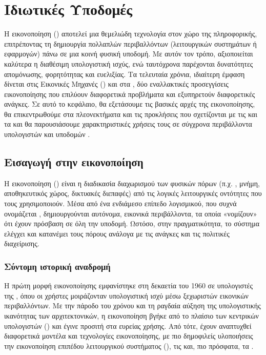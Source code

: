
\chapter{Ιδιωτικές Υποδομές}\label{ch:virtualization}

Η εικονοποίηση () αποτελεί μια θεμελιώδη τεχνολογία στον χώρο της πληροφορικής, επιτρέποντας τη δημιουργία πολλαπλών περιβαλλόντων (λειτουργικών συστημάτων ή εφαρμογών) πάνω σε μια κοινή φυσική υποδομή. Με αυτόν τον τρόπο, αξιοποιείται καλύτερα η διαθέσιμη υπολογιστική ισχύς, ενώ ταυτόχρονα παρέχονται δυνατότητες απομόνωσης, φορητότητας και ευελιξίας. Τα τελευταία χρόνια, ιδιαίτερη έμφαση δίνεται στις Εικονικές Μηχανές () και στα , δύο εναλλακτικές προσεγγίσεις εικονοποίησης που επιλύουν διαφορετικά προβλήματα και εξυπηρετούν διαφορετικές ανάγκες. Σε αυτό το κεφάλαιο, θα εξετάσουμε τις βασικές αρχές της εικονοποίησης, θα επικεντρωθούμε στα πλεονεκτήματα και τις προκλήσεις που σχετίζονται με τις  και τα  και θα παρουσιάσουμε χαρακτηριστικές χρήσεις τους σε σύγχρονα περιβάλλοντα υπολογιστών και υποδομών .

\section{Εισαγωγή στην εικονοποίηση}

Η εικονοποίηση () είναι η διαδικασία διαχωρισμού των φυσικών πόρων (π.χ. , μνήμη, αποθηκευτικός χώρος, δικτυακές διεπαφές) από τις λογικές λειτουργικές οντότητες που τους χρησιμοποιούν. Μέσα από ένα ενδιάμεσο επίπεδο λογισμικού, που συχνά ονομάζεται , δημιουργούνται αυτόνομα, εικονικά περιβάλλοντα, τα οποία «νομίζουν» ότι έχουν πρόσβαση σε όλη την υποδομή. Ωστόσο, στην πραγματικότητα, το σύστημα ελέγχει και κατανέμει τους πόρους ανάλογα με τις ανάγκες και τις πολιτικές διαχείρισης.

\subsection{Σύντομη ιστορική αναδρομή}

Η πρώτη μορφή εικονοποίησης εμφανίστηκε στη δεκαετία του 1960 σε υπολογιστές  της , όπου οι χρήστες μοιράζονταν υπολογιστική ισχύ μέσω ξεχωριστών εικονικών περιβαλλόντων. Με την πάροδο του χρόνου και τη ραγδαία αύξηση της υπολογιστικής ικανότητας των  αρχιτεκτονικών, η εικονοποίηση βγήκε από το πλαίσιο των κεντρικών υπολογιστών () και έγινε προσιτή στα  ευρείας χρήσης. Από τότε, έχουν αναπτυχθεί διαφορετικά μοντέλα και τεχνολογίες εικονοποίησης, με πιο δημοφιλείς υλοποιήσεις την εικονοποίηση επιπέδου λειτουργικού συστήματος (), τις  και, πιο πρόσφατα, τα .

